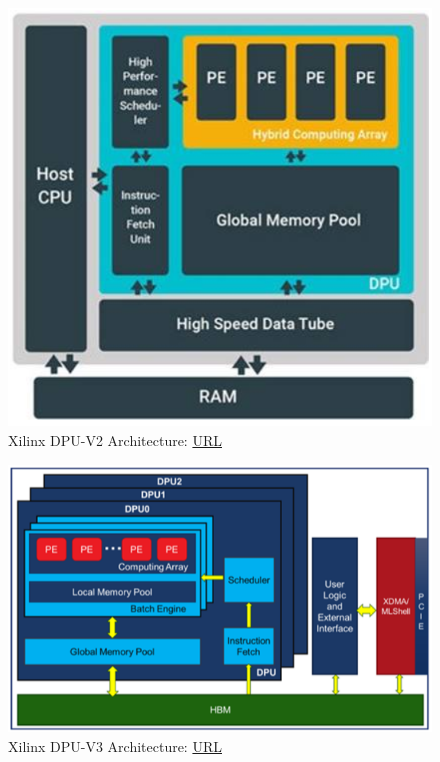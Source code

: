 \begin{figure} [H]
	\centering
	\includegraphics[scale=0.6]{Images/Hardware/dpu-v2-architecture.png}
	\decoRule
	\caption[Xilinx DPU-V2 Architecture]{Xilinx DPU-V2 Architecture: \href{https://www.xilinx.com/html_docs/vitis_ai/1_1/vpt1571919210634.html}{URL}}
	\label{fig:dpu-v2-architecture}
\end{figure}

\begin{figure} [H]
	\centering
	\includegraphics[scale=0.6]{Images/Hardware/dpu-v3-architecture.png}
	\decoRule
	\caption[Xilinx DPU-V3 Architecture]{Xilinx DPU-V3 Architecture: \href{https://www.xilinx.com/html_docs/vitis_ai/1_1/xyt1583919665886.html}{URL}}
	\label{fig:dpu-v3-architecture}
\end{figure}

